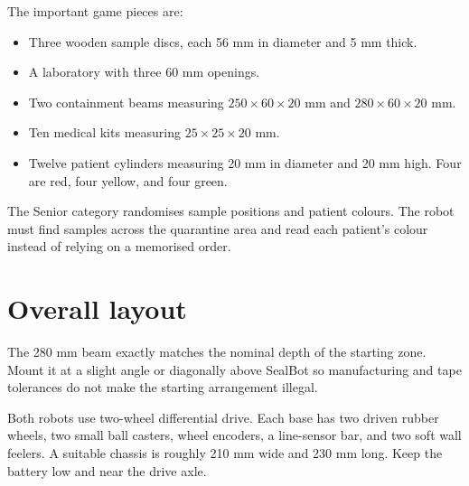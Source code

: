 \documentclass[11pt,a4paper]{article}
\begin{document}
The important game pieces are:

\begin{itemize}
  \item Three wooden sample discs, each 56 mm in diameter and 5 mm thick.
  \item A laboratory with three 60 mm openings.
  \item Two containment beams measuring $250 \times 60 \times 20$ mm and $280 \times 60 \times 20$ mm.
  \item Ten medical kits measuring $25 \times 25 \times 20$ mm.
  \item Twelve patient cylinders measuring 20 mm in diameter and 20 mm high. Four are red, four yellow, and four green.
\end{itemize}

The Senior category randomises sample positions and patient colours. The robot must find samples across the quarantine area and read each patient's colour instead of relying on a memorised order.

\section{Overall layout}

\begin{center}
\end{center}

The 280 mm beam exactly matches the nominal depth of the starting zone. Mount it at a slight angle or diagonally above SealBot so manufacturing and tape tolerances do not make the starting arrangement illegal.

Both robots use two-wheel differential drive. Each base has two driven rubber wheels, two small ball casters, wheel encoders, a line-sensor bar, and two soft wall feelers. A suitable chassis is roughly 210 mm wide and 230 mm long. Keep the battery low and near the drive axle.
\end{document}
